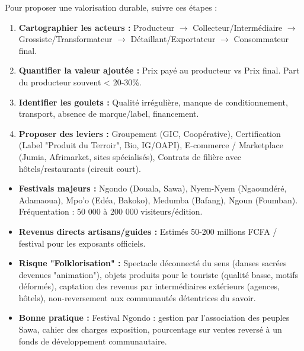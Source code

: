 \documentclass[11pt]{article}
\begin{document}
\begin{methode}
Pour proposer une valorisation durable, suivre ces étapes :
\begin{enumerate}
    \item \textbf{Cartographier les acteurs :} Producteur $\to$ Collecteur/Intermédiaire $\to$ Grossiste/Transformateur $\to$ Détaillant/Exportateur $\to$ Consommateur final.
    \item \textbf{Quantifier la valeur ajoutée :} Prix payé au producteur vs Prix final. Part du producteur souvent < 20-30\%.
    \item \textbf{Identifier les goulets :} Qualité irrégulière, manque de conditionnement, transport, absence de marque/label, financement.
    \item \textbf{Proposer des leviers :} Groupement (GIC, Coopérative), Certification (Label "Produit du Terroir", Bio, IG/OAPI), E-commerce / Marketplace (Jumia, Afrimarket, sites spécialisés), Contrats de filière avec hôtels/restaurants (circuit court).
\end{enumerate}
\end{methode}

\begin{exemplebox}
\begin{itemize}
    \item \textbf{Festivals majeurs :} Ngondo (Douala, Sawa), Nyem-Nyem (Ngaoundéré, Adamaoua), Mpo'o (Edéa, Bakoko), Medumba (Bafang), Ngoun (Foumban). Fréquentation : 50 000 à 200 000 visiteurs/édition.
    \item \textbf{Revenus directs artisans/guides :} Estimés 50-200 millions FCFA / festival pour les exposants officiels.
    \item \textbf{Risque "Folklorisation" :} Spectacle déconnecté du sens (danses sacrées devenues "animation"), objets produits pour le touriste (qualité basse, motifs déformés), captation des revenus par intermédiaires extérieurs (agences, hôtels), non-reversement aux communautés détentrices du savoir.
    \item \textbf{Bonne pratique :} Festival Ngondo : gestion par l'association des peuples Sawa, cahier des charges exposition, pourcentage sur ventes reversé à un fonds de développement communautaire.
\end{itemize}
\end{exemplebox}
\end{document}
